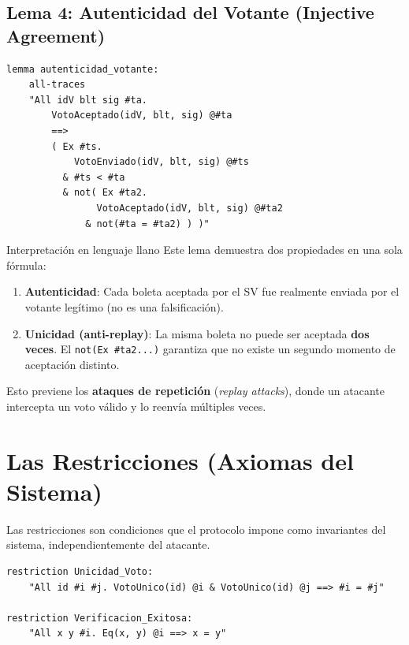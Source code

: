 \documentclass[12pt, a4paper]{article}
\begin{document}
\subsection{Lema 4: Autenticidad del Votante (Injective Agreement)}

\begin{lstlisting}[caption={Lema: Cada aceptación corresponde a un envío único.}]
lemma autenticidad_votante:
    all-traces
    "All idV blt sig #ta.
        VotoAceptado(idV, blt, sig) @#ta
        ==>
        ( Ex #ts.
            VotoEnviado(idV, blt, sig) @#ts
          & #ts < #ta
          & not( Ex #ta2.
                VotoAceptado(idV, blt, sig) @#ta2
              & not(#ta = #ta2) ) )"
\end{lstlisting}

\begin{cajaConceto}{Interpretación en lenguaje llano}
Este lema demuestra dos propiedades en una sola fórmula:
\begin{enumerate}
  \item \textbf{Autenticidad}: Cada boleta aceptada por el SV fue
        realmente enviada por el votante legítimo (no es una falsificación).
  \item \textbf{Unicidad (anti-replay)}: La misma boleta no puede ser
        aceptada \textbf{dos veces}. El \texttt{not(Ex \#ta2...)} garantiza
        que no existe un segundo momento de aceptación distinto.
\end{enumerate}
Esto previene los \textbf{ataques de repetición} (\textit{replay attacks}),
donde un atacante intercepta un voto válido y lo reenvía múltiples veces.
\end{cajaConceto}

\section{Las Restricciones (Axiomas del Sistema)}

Las restricciones son condiciones que el protocolo impone como invariantes
del sistema, independientemente del atacante.

\begin{lstlisting}[caption={Restricciones del modelo.}]
restriction Unicidad_Voto:
    "All id #i #j. VotoUnico(id) @i & VotoUnico(id) @j ==> #i = #j"

restriction Verificacion_Exitosa:
    "All x y #i. Eq(x, y) @i ==> x = y"
\end{lstlisting}
\end{document}

